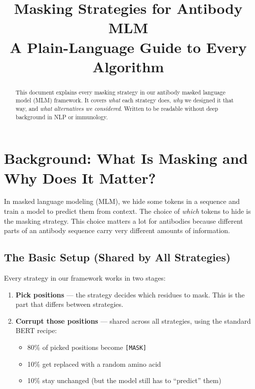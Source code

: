 \documentclass[11pt]{article}
\title{\textbf{Masking Strategies for Antibody MLM} \\[4pt]
\large A Plain-Language Guide to Every Algorithm}
\author{}
\date{}
\begin{document}
\maketitle

\begin{abstract}
This document explains every masking strategy in our antibody masked
language model (MLM) framework. It covers \emph{what} each strategy
does, \emph{why} we designed it that way, and \emph{what alternatives
we considered}. Written to be readable without deep background in
NLP or immunology.
\end{abstract}

\tableofcontents
\newpage

\section{Background: What Is Masking and Why Does It Matter?}

In masked language modeling (MLM), we hide some tokens in a sequence
and train a model to predict them from context. The choice of
\emph{which} tokens to hide is the masking strategy. This choice
matters a lot for antibodies because different parts of an antibody
sequence carry very different amounts of information.

\subsection{The Basic Setup (Shared by All Strategies)}

Every strategy in our framework works in two stages:

\begin{enumerate}
\item \textbf{Pick positions} --- the strategy decides which residues
      to mask. This is the part that differs between strategies.
\item \textbf{Corrupt those positions} --- shared across all strategies,
      using the standard BERT recipe:
      \begin{itemize}
          \item 80\% of picked positions become \texttt{[MASK]}
          \item 10\% get replaced with a random amino acid
          \item 10\% stay unchanged (but the model still has to
                ``predict'' them)
      \end{itemize}
\end{enumerate}
\end{document}
